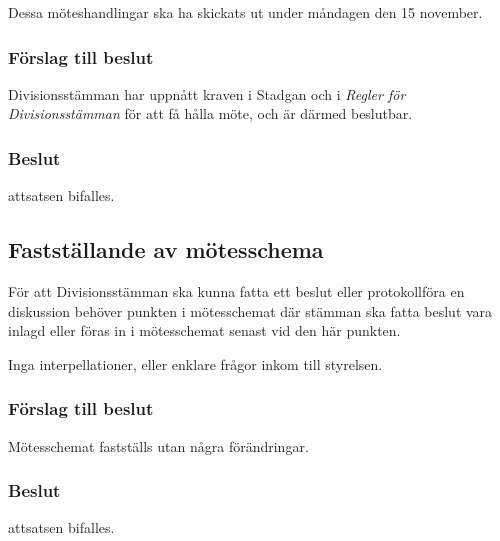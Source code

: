 \documentclass[protokoll]{dvd}
\begin{document}
Dessa möteshandlingar ska ha skickats ut under måndagen den 15 november.

\subsubsection*{Förslag till beslut}

\begin{attsatser}
	\item Divisionsstämman har uppnått kraven i Stadgan och i \emph{Regler för Divisionsstämman} för att få hålla möte, och är därmed beslutbar.
\end{attsatser}

\subsubsection*{Beslut}

\begin{attsatser}
	\item attsatsen bifalles.
\end{attsatser}

\newpage

\subsection{Fastställande av mötesschema}

För att Divisionsstämman ska kunna fatta ett beslut eller protokollföra en diskussion behöver punkten i mötesschemat där stämman ska fatta beslut vara inlagd eller föras in i mötesschemat senast vid den här punkten.

Inga interpellationer, eller enklare frågor inkom till styrelsen.


\subsubsection*{Förslag till beslut}

\begin{attsatser}
	\item Mötesschemat fastställs utan några förändringar.
\end{attsatser}

\subsubsection*{Beslut}

\begin{attsatser}
	\item attsatsen bifalles.
\end{attsatser}
\end{document}
